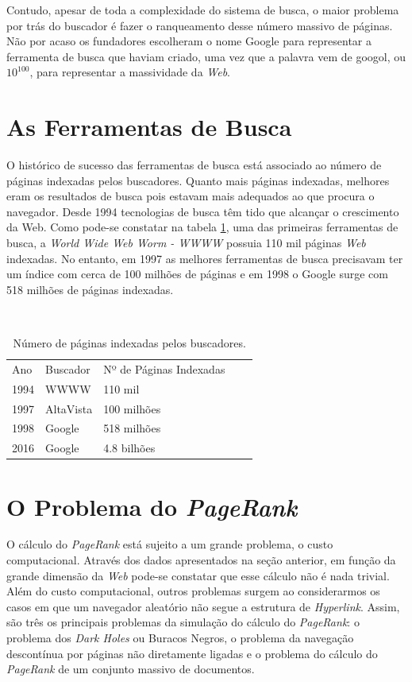 Contudo, apesar de toda a complexidade do sistema de busca, o maior problema por trás do buscador é fazer o ranqueamento desse número massivo de páginas. Não por acaso os fundadores escolheram o nome Google para representar a ferramenta de busca que haviam criado, uma vez que a palavra vem de googol, ou $10^{100}$, para representar a massividade da \textit{Web}. 


\section{As Ferramentas de Busca}%

O histórico de sucesso das ferramentas de busca está associado ao número de páginas indexadas pelos buscadores. Quanto mais páginas indexadas, melhores eram os resultados de busca pois estavam mais adequados ao que procura o navegador. Desde 1994 tecnologias de busca têm tido que alcançar o crescimento da Web. Como pode-se constatar na tabela \ref{websize}, uma das primeiras ferramentas de busca, a \textit{World Wide Web Worm - WWWW} \cite{mcbryan1994genvl} possuia 110 mil páginas \textit{Web} indexadas. No entanto, em 1997 as melhores ferramentas de busca precisavam ter um índice com cerca de 100 milhões de páginas e em 1998 o Google surge com 518 milhões de páginas indexadas.

\vspace{0.3cm}

\
\begin{table}[!htb]
\centering
\begin{tabular}{lllll}
Ano & Buscador & Nº de Páginas Indexadas\\
1994 & WWWW & 110 mil\\
1997 & AltaVista & 100 milhões\\
1998 & Google & 518 milhões\\
2016 & Google & 4.8 bilhões
\end{tabular}
\caption{Número de páginas indexadas pelos buscadores.}
\label{websize}
\end{table}


\section{O Problema do \textit{PageRank}}%

O cálculo do \textit{PageRank} está sujeito a um grande problema, o custo computacional. Através dos dados apresentados na seção anterior, em função da grande dimensão da \textit{Web} pode-se constatar que esse cálculo não é nada trivial. Além do custo computacional, outros problemas surgem ao considerarmos os casos em que um navegador aleatório \cite{avrachenkov2007monte} não segue a estrutura de \textit{Hyperlink}. Assim, são três os principais problemas da simulação do cálculo do \textit{PageRank}: o problema dos \textit{Dark Holes} ou Buracos Negros, o problema da navegação descontínua por páginas não diretamente ligadas e o problema do cálculo do \textit{PageRank} de um conjunto massivo de documentos.

